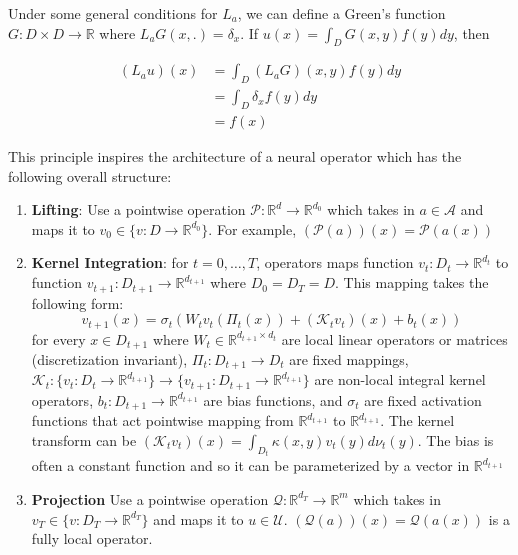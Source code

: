 \documentclass[12pt]{article}
\begin{document}
Under some general conditions for $L_a$, we can define a Green's function $G: D \times D \to \mathbb{R}$ where $L_a G(x, .) = \delta_x $. If $u(x) = \int_D G(x, y) f(y)dy$, then

\begin{align*}
    (L_au)(x) &= \int_D (L_aG)(x, y) f(y)dy \\
    &= \int_D \delta_x f(y)dy \\ 
    &= f(x)
\end{align*}

This principle inspires the architecture of a neural operator which has the following overall structure:
\begin{enumerate}
    \item \textbf{Lifting}: Use a pointwise operation $\mathcal{P}: \mathbb{R}^d \to \mathbb{R}^{d_0}$ which takes in $a \in \mathcal{A}$ and maps it to $v_0 \in \{v : D \to \mathbb{R}^{d_0}\}$. For example, $(\mathcal{P}(a))(x) = \mathcal{P}(a(x))$
    \item \textbf{Kernel Integration}: for $t = 0, \dots, T$, operators maps function $v_t: D_t \to \mathbb{R}^{d_t}$ to function $v_{t + 1}: D_{t + 1} \to \mathbb{R}^{d_{t + 1}}$ where $D_0 = D_T = D$. This mapping takes the following form:
    $$v_{t + 1}(x) = \sigma_t\left(W_tv_t(\Pi_t(x)) + (\mathcal{K}_tv_t)(x) + b_t(x)\right)$$ for every $x \in D_{t + 1}$ where $W_t \in \mathbb{R}^{d_{t + 1} \times d_{t}}$ are local linear operators or matrices (discretization invariant), $\Pi_t : D_{t + 1} \to D_{t}$ are fixed mappings, $\mathcal{K}_t: \{v_t: D_t \to \mathbb{R}^{d_{t + 1}}\} \to \{v_{t + 1}: D_{t + 1} \to \mathbb{R}^{d_{t + 1}}\}$ are non-local integral kernel operators, $b_t: D_{t + 1} \to \mathbb{R}^{d_{t + 1}}$ are bias functions, and $\sigma_t$ are fixed activation functions that act pointwise mapping from $\mathbb{R}^{d_{t + 1}}$ to $\mathbb{R}^{d_{t + 1}}$. The kernel transform can be $(\mathcal{K}_tv_t)(x) = \int_{D_t}\kappa(x, y)v_t(y)d\nu_t(y)$. The bias is often a constant function and so it can be parameterized by a vector in $\mathbb{R}^{d_{t + 1}}$
    \item \textbf{Projection} Use a pointwise operation $\mathcal{Q}: \mathbb{R}^{d_T} \to \mathbb{R}^{m}$ which takes in $v_T \in \{v : D_T \to \mathbb{R}^{d_T}\}$ and maps it to $u \in \mathcal{U}$. $(\mathcal{Q}(a))(x) = \mathcal{Q}(a(x))$ is a fully local operator. 
\end{enumerate}
\end{document}
